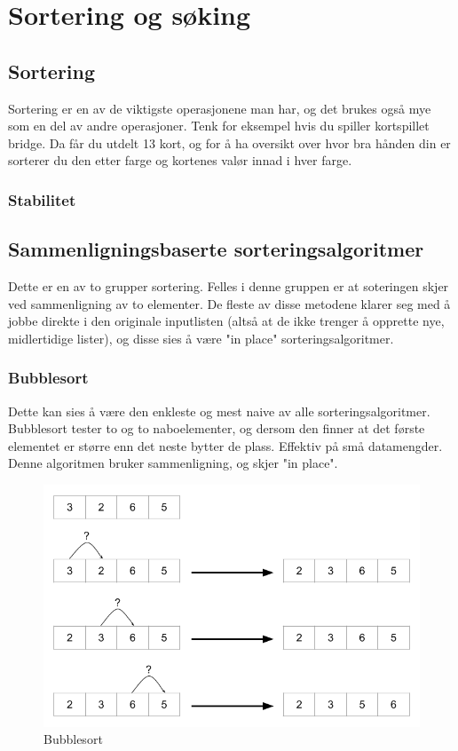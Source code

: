 \section{Sortering og søking}

\subsection{Sortering}
Sortering er en av de viktigste operasjonene man har, og det brukes også mye som en del av andre operasjoner. Tenk for eksempel hvis du spiller kortspillet bridge. Da får du utdelt 13 kort, og for å ha oversikt over hvor bra hånden din er sorterer du den etter farge og kortenes valør innad i hver farge.

\subsubsection{Stabilitet}

\subsection{Sammenligningsbaserte sorteringsalgoritmer}
Dette er en av to grupper sortering. Felles i denne gruppen er at soteringen skjer ved sammenligning av to elementer. De fleste av disse metodene klarer seg med å jobbe direkte i den originale inputlisten (altså at de ikke trenger å opprette nye, midlertidige lister), og disse sies å være "in place" sorteringsalgoritmer.

\subsubsection{Bubblesort}
Dette kan sies å være den enkleste og mest naive av alle sorteringsalgoritmer. Bubblesort tester to og to naboelementer, og dersom den finner at det første elementet er større enn det neste bytter de plass. Effektiv på små datamengder. Denne algoritmen bruker sammenligning, og skjer "in place".

\begin{figure}[H]
\includegraphics[scale=0.5]{images/bubblesort}
\centering %
\caption{Bubblesort}
\label{fig:bubblesort}
\end{figure}

